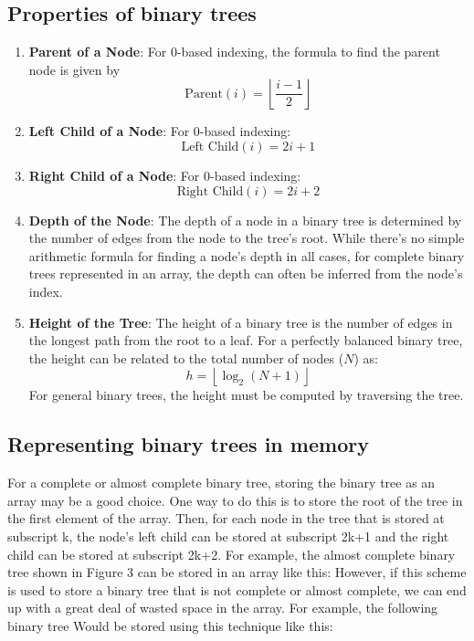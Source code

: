 \documentclass{report}
\begin{document}
    \bigbreak \noindent 
    \subsection{Properties of binary trees}
    \begin{enumerate}
        \item \textbf{Parent of a Node}:
            For 0-based indexing, the formula to find the parent node is given by
            $$\text{Parent}(i) = \left\lfloor \frac{i-1}{2} \right\rfloor$$

        \item \textbf{Left Child of a Node}:
            For 0-based indexing:
            $$\text{Left Child}(i) = 2i + 1$$

        \item \textbf{Right Child of a Node}:
            For 0-based indexing:
            $$\text{Right Child}(i) = 2i + 2$$

        \item \textbf{Depth of the Node}:
            The depth of a node in a binary tree is determined by the number of edges from the node to the tree's root. While there's no simple arithmetic formula for finding a node's depth in all cases, for complete binary trees represented in an array, the depth can often be inferred from the node's index.

        \item \textbf{Height of the Tree}:
            The height of a binary tree is the number of edges in the longest path from the root to a leaf. For a perfectly balanced binary tree, the height can be related to the total number of nodes (\(N\)) as:
            $$h = \left\lfloor \log_2(N+1) \right\rfloor$$
            For general binary trees, the height must be computed by traversing the tree.
    \end{enumerate}

    \bigbreak \noindent 
    \subsection{Representing binary trees in memory}
    \bigbreak \noindent 
    For a complete or almost complete binary tree, storing the binary tree as an array may be a good choice.
    \bigbreak \noindent 
    One way to do this is to store the root of the tree in the first element of the array. Then, for each node in the tree that is stored at subscript k, the node's left child can be stored at subscript 2k+1 and the right child can be stored at subscript 2k+2. For example, the almost complete binary tree shown in Figure 3 can be stored in an array like this:
    \bigbreak \noindent 
    \bigbreak \noindent 
    However, if this scheme is used to store a binary tree that is not complete or almost complete, we can end up with a great deal of wasted space in the array. For example, the following binary tree
    \bigbreak \noindent 
    \bigbreak \noindent 
    Would be stored using this technique like this:
    \bigbreak \noindent 
\end{document}
